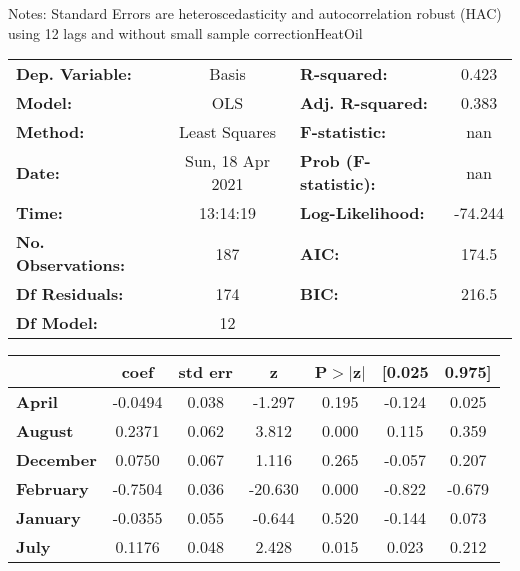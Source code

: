 Notes: \newline
 [1] Standard Errors are heteroscedasticity and autocorrelation robust (HAC) using 12 lags and without small sample correctionHeatOil\begin{center}
\begin{tabular}{lclc}
\toprule
\textbf{Dep. Variable:}    &      Basis       & \textbf{  R-squared:         } &     0.423   \\
\textbf{Model:}            &       OLS        & \textbf{  Adj. R-squared:    } &     0.383   \\
\textbf{Method:}           &  Least Squares   & \textbf{  F-statistic:       } &       nan   \\
\textbf{Date:}             & Sun, 18 Apr 2021 & \textbf{  Prob (F-statistic):} &      nan    \\
\textbf{Time:}             &     13:14:19     & \textbf{  Log-Likelihood:    } &   -74.244   \\
\textbf{No. Observations:} &         187      & \textbf{  AIC:               } &     174.5   \\
\textbf{Df Residuals:}     &         174      & \textbf{  BIC:               } &     216.5   \\
\textbf{Df Model:}         &          12      & \textbf{                     } &             \\
\bottomrule
\end{tabular}
\begin{tabular}{lcccccc}
                   & \textbf{coef} & \textbf{std err} & \textbf{z} & \textbf{P$> |$z$|$} & \textbf{[0.025} & \textbf{0.975]}  \\
\midrule
\textbf{April}     &      -0.0494  &        0.038     &    -1.297  &         0.195        &       -0.124    &        0.025     \\
\textbf{August}    &       0.2371  &        0.062     &     3.812  &         0.000        &        0.115    &        0.359     \\
\textbf{December}  &       0.0750  &        0.067     &     1.116  &         0.265        &       -0.057    &        0.207     \\
\textbf{February}  &      -0.7504  &        0.036     &   -20.630  &         0.000        &       -0.822    &       -0.679     \\
\textbf{January}   &      -0.0355  &        0.055     &    -0.644  &         0.520        &       -0.144    &        0.073     \\
\textbf{July}      &       0.1176  &        0.048     &     2.428  &         0.015        &        0.023    &        0.212     \\

\end{tabular}
\end{center}
